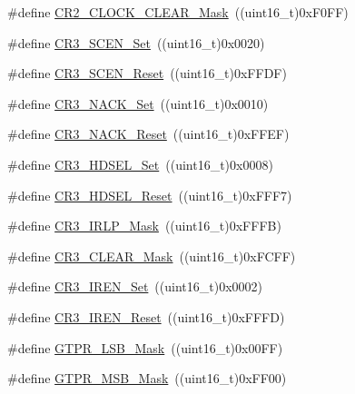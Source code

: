 \begin{DoxyCompactItemize}
\item 
\#define \hyperlink{group___u_s_a_r_t___private___defines_ga846e1873279b2b0798cc34d76bd80592}{C\+R2\+\_\+\+C\+L\+O\+C\+K\+\_\+\+C\+L\+E\+A\+R\+\_\+\+Mask}~((uint16\+\_\+t)0x\+F0\+F\+F)
\item 
\#define \hyperlink{group___u_s_a_r_t___private___defines_gab47df7b36b4f1315953f6aa45de2fb61}{C\+R3\+\_\+\+S\+C\+E\+N\+\_\+\+Set}~((uint16\+\_\+t)0x0020)
\item 
\#define \hyperlink{group___u_s_a_r_t___private___defines_ga294c473dc7f8ff3e9cbaa0675c8c75f3}{C\+R3\+\_\+\+S\+C\+E\+N\+\_\+\+Reset}~((uint16\+\_\+t)0x\+F\+F\+D\+F)
\item 
\#define \hyperlink{group___u_s_a_r_t___private___defines_ga950cc9f7251709854754add7d9aaca60}{C\+R3\+\_\+\+N\+A\+C\+K\+\_\+\+Set}~((uint16\+\_\+t)0x0010)
\item 
\#define \hyperlink{group___u_s_a_r_t___private___defines_gabed0cac273ff4faf009e8c35243c1e10}{C\+R3\+\_\+\+N\+A\+C\+K\+\_\+\+Reset}~((uint16\+\_\+t)0x\+F\+F\+E\+F)
\item 
\#define \hyperlink{group___u_s_a_r_t___private___defines_ga0c5c30ea9777d0c8c6f1b5ff85dfca3c}{C\+R3\+\_\+\+H\+D\+S\+E\+L\+\_\+\+Set}~((uint16\+\_\+t)0x0008)
\item 
\#define \hyperlink{group___u_s_a_r_t___private___defines_ga762c72448ba24f3487dfa457a8dcc9fc}{C\+R3\+\_\+\+H\+D\+S\+E\+L\+\_\+\+Reset}~((uint16\+\_\+t)0x\+F\+F\+F7)
\item 
\#define \hyperlink{group___u_s_a_r_t___private___defines_gaea5d8d002a34c3a587719533db2c17f9}{C\+R3\+\_\+\+I\+R\+L\+P\+\_\+\+Mask}~((uint16\+\_\+t)0x\+F\+F\+F\+B)
\item 
\#define \hyperlink{group___u_s_a_r_t___private___defines_ga085e8ef6bc8f5de45c5be95971715f7f}{C\+R3\+\_\+\+C\+L\+E\+A\+R\+\_\+\+Mask}~((uint16\+\_\+t)0x\+F\+C\+F\+F)
\item 
\#define \hyperlink{group___u_s_a_r_t___private___defines_gad5dd1d08f3836f9a3c3f3cc0c66a8b8f}{C\+R3\+\_\+\+I\+R\+E\+N\+\_\+\+Set}~((uint16\+\_\+t)0x0002)
\item 
\#define \hyperlink{group___u_s_a_r_t___private___defines_gad1520358de97e48fe18780e5cc5296bd}{C\+R3\+\_\+\+I\+R\+E\+N\+\_\+\+Reset}~((uint16\+\_\+t)0x\+F\+F\+F\+D)
\item 
\#define \hyperlink{group___u_s_a_r_t___private___defines_ga2fe593d0c308e2245bb66905930b3ebb}{G\+T\+P\+R\+\_\+\+L\+S\+B\+\_\+\+Mask}~((uint16\+\_\+t)0x00\+F\+F)
\item 
\#define \hyperlink{group___u_s_a_r_t___private___defines_ga405b4222892bafdf1d084de5efd24d70}{G\+T\+P\+R\+\_\+\+M\+S\+B\+\_\+\+Mask}~((uint16\+\_\+t)0x\+F\+F00)

\end{DoxyCompactItemize}
